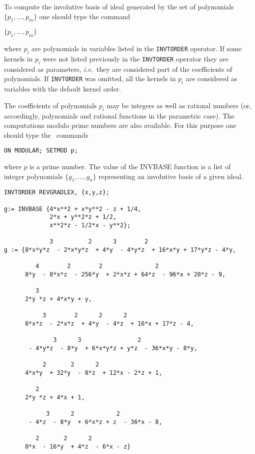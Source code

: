 To compute the involutive basis of ideal generated by the set of
polynomials $\{p_1,...,p_m\}$ one should type the command

 $\{p_1,...,p_m\} $

where $p_i$ are polynomials in variables listed in the
{\tt INVTORDER} operator. If some kernels in $p_i$ were not listed
previously in the {\tt INVTORDER} operator they are considered as
parameters, {\em i.e.\ }they are considered part of the coefficients of
polynomials.  If {\tt INVTORDER} was omitted, all the kernels
in $p_i$ are considered as variables with the default \REDUCE{}
kernel order.

The coefficients of polynomials $p_i$ may be integers as well as
rational numbers (or, accordingly, polynomials and rational functions
in the parametric case). The computations modulo prime numbers are
also available. For this purpose one should type the \REDUCE\ commands
\begin{verbatim}
ON MODULAR; SETMOD p;
\end{verbatim}
where $p$ is a prime number.
The value of the \f{INVBASE} function is a list of integer polynomials
$\{g_1,...,g_n\}$ representing an involutive basis of a given ideal.

\begin{verbatim}
INVTORDER REVGRADLEX, {x,y,z};

g:= INVBASE {4*x**2 + x*y**2 - z + 1/4,
             2*x + y**2*z + 1/2,
             x**2*z - 1/2*x - y**2};

             3          2      3        2
g := {8*x*y*z  - 2*x*y*z  + 4*y  - 4*y*z  + 16*x*y + 17*y*z - 4*y,

         4        2        2               2
      8*y  - 8*x*z  - 256*y  + 2*x*z + 64*z  - 96*x + 20*z - 9,

         3
      2*y *z + 4*x*y + y,

           3        2      2      2
      8*x*z  - 2*x*z  + 4*y  - 4*z  + 16*x + 17*z - 4,

              3      3                2
       - 4*y*z  - 8*y  + 6*x*y*z + y*z  - 36*x*y - 8*y,

           2       2      2
      4*x*y  + 32*y  - 8*z  + 12*x - 2*z + 1,

         2
      2*y *z + 4*x + 1,

            3      2            2
       - 4*z  - 8*y  + 6*x*z + z  - 36*x - 8,

         2       2      2
      8*x  - 16*y  + 4*z  - 6*x - z}
\end{verbatim}

